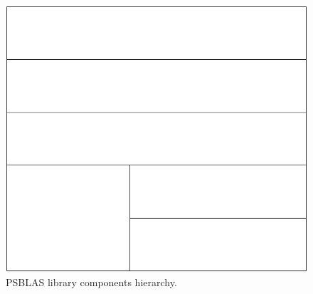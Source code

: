 \begin{figure}[h] \begin{center}
\includegraphics[scale=0.45]{figures/psblas}
\end{center}
\caption{PSBLAS library components hierarchy.\label{fig:psblas}}
\end{figure}

